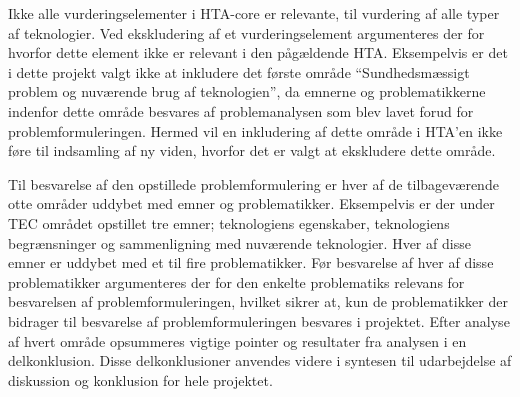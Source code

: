 Ikke alle vurderingselementer i HTA-core er relevante, til vurdering af alle typer af teknologier. Ved ekskludering af et vurderingselement argumenteres der for hvorfor dette element ikke er relevant i den pågældende HTA. \citep{HTAcore} Eksempelvis er det i dette projekt valgt ikke at inkludere det første område “Sundhedsmæssigt problem og nuværende brug af teknologien”, da emnerne og problematikkerne indenfor dette område besvares af problemanalysen som blev lavet forud for problemformuleringen. Hermed vil en inkludering af dette område i HTA’en ikke føre til indsamling af ny viden, hvorfor det er valgt at ekskludere dette område. 

Til besvarelse af den opstillede problemformulering er hver af de tilbageværende otte områder uddybet med emner og problematikker. Eksempelvis er der under TEC området opstillet tre emner; teknologiens egenskaber, teknologiens begrænsninger og sammenligning med nuværende teknologier. Hver af disse emner er uddybet med et til fire problematikker. Før besvarelse af hver af disse problematikker argumenteres der for den enkelte problematiks relevans for besvarelsen af problemformuleringen, hvilket sikrer at, kun de problematikker der bidrager til  besvarelse af problemformuleringen besvares i projektet. Efter analyse af hvert område opsummeres vigtige pointer og resultater fra analysen i en delkonklusion. Disse delkonklusioner anvendes videre i syntesen til udarbejdelse af diskussion og konklusion for hele projektet.    

